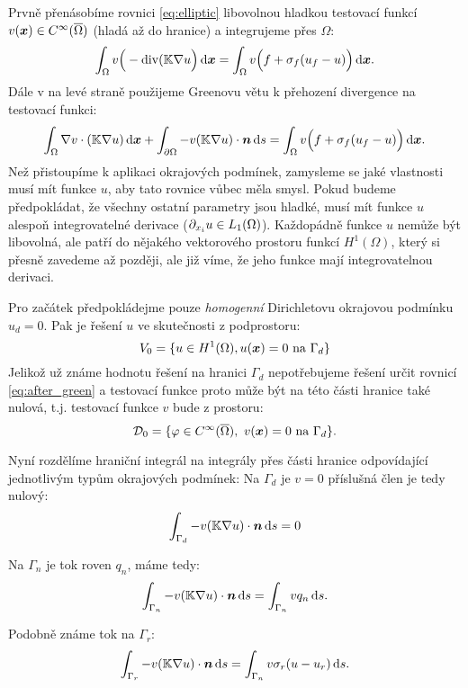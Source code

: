 Prvně přenásobíme rovnici \eqref{eq:elliptic} libovolnou hladkou testovací funkcí 
$v(\mathbf{\boldsymbol{x}}) \in C^\infty(\overline{\Omega})$ (hladá až do hranice) a integrujeme přes $\Omega$:
\[
    \int_\Omega v\Big(-\operatorname{div}({\mathbb{K}}\nabla u\Big) \,{\rm d} \mathbf{\boldsymbol{x}} = \int_\Omega v \Big(f + \sigma_f(u_f - u)\Big) \,{\rm d} \mathbf{\boldsymbol{x}}.
\]
Dále v na levé straně použijeme Greenovu větu k přehození divergence na testovací funkci:
\begin{equation}
    \label{eq:after_green}
    \int_\Omega \nabla v \cdot ({\mathbb{K}}\nabla u) \,{\rm d} \mathbf{\boldsymbol{x}} + \int_{\partial \Omega} -v({\mathbb{K}}\nabla u)\cdot \mathbf{\boldsymbol{n}} \,{\rm d} s 
    = \int_\Omega v \Big(f + \sigma_f(u_f - u)\Big) \,{\rm d} \mathbf{\boldsymbol{x}}.
\end{equation}
Než přistoupíme k aplikaci okrajových podmínek, zamysleme se jaké vlastnosti musí mít funkce $u$, 
aby tato rovnice vůbec měla smysl. Pokud budeme předpokládat, že 
všechny ostatní parametry jsou hladké, musí mít funkce $u$ alespoň integrovatelné derivace 
($\partial_{x_i} u \in L_1(\Omega)$). Každopádně funkce $u$ nemůže být libovolná, 
ale patří do nějakého vektorového prostoru funkcí $H^1(\Omega)$, který si přesně zavedeme až později,
ale již víme, že jeho funkce mají integrovatelnou derivaci.

Pro začátek předpokládejme pouze \emph{homogenní} Dirichletovu okrajovou podmínku $u_d =0$. 
Pak je řešení $u$ ve skutečnosti z podprostoru:
\[
    V_0 = \{ u\in H^1(\Omega), u(\mathbf{\boldsymbol{x}}) = 0\text{ na } \Gamma_d \}
\]
Jelikož už známe hodnotu řešení na hranici $\Gamma_d$ nepotřebujeme řešení určit rovnicí 
\eqref{eq:after_green} a testovací funkce proto může být na této části hranice také nulová, t.j. 
testovací funkce $v$ bude z prostoru:
\[
     \mathcal D_0 = \{\varphi \in C^\infty(\overline{\Omega}),\ v(\mathbf{\boldsymbol{x}}) = 0\text{ na } \Gamma_d\}.
\]

Nyní rozdělíme hraniční integrál na integrály přes části hranice odpovídající 
jednotlivým typům okrajových podmínek:
Na $\Gamma_d$ je $v=0$ příslušná člen je tedy nulový:
\[
    \int_{\Gamma_d} -v({\mathbb{K}}\nabla u)\cdot \mathbf{\boldsymbol{n}} \,{\rm d} s = 0
\]

Na $\Gamma_n$ je tok roven $q_n$, máme tedy:
\[
    \int_{\Gamma_n} -v({\mathbb{K}}\nabla u)\cdot \mathbf{\boldsymbol{n}} \,{\rm d} s = \int_{\Gamma_n} v q_n \,{\rm d} s.
\]

Podobně známe tok na $\Gamma_r$:
\[
    \int_{\Gamma_r} -v({\mathbb{K}}\nabla u)\cdot \mathbf{\boldsymbol{n}} \,{\rm d} s = \int_{\Gamma_n} v \sigma_r(u - u_r) \,{\rm d} s.
\]

